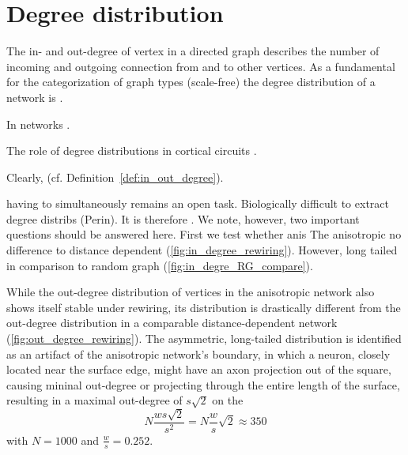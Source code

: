 
\section{Degree distribution}\label{sec:degree_distribution}

The in- and out-degree of vertex in a directed graph describes the
number of incoming and outgoing connection from and to other
vertices. As a fundamental for the categorization of graph types
(scale-free) the degree distribution of a network is .

In networks . 

The role of degree distributions in cortical circuits \parencite{Roxin2011}.

 Clearly, (cf. Definition~\ref{def:in_out_degree}).

 having to simultaneously remains an open task.
Biologically difficult to extract degree distribs (Perin). It is
therefore . We note, however, two important questions should be answered
here. First we test whether anis The anisotropic no difference to
distance dependent (\autoref{fig:in_degree_rewiring}). However, long
tailed in comparison to random graph
(\autoref{fig:in_degre_RG_compare}).

While the out-degree distribution of vertices in the anisotropic
network also shows itself stable under rewiring, its distribution is
drastically different from the out-degree distribution in a comparable
distance-dependent network (\autoref{fig:out_degree_rewiring}). The
asymmetric, long-tailed distribution is identified as an artifact of
the anisotropic network's boundary, in which a neuron, closely located
near the surface edge, might have an axon projection out of the
square, causing mininal out-degree or projecting through the entire
length of the surface, resulting in a maximal out-degree of
$s\sqrt{2}$ on the 
\[
N \frac{ws\sqrt{2}}{s^2} = N \frac{w}{s} \sqrt{2} \approx 350
\]
with $N = 1000$ and $\frac{w}{s} = 0.252$.

